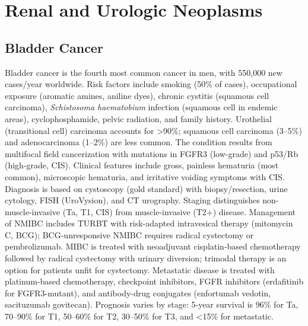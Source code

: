 \section{Renal and Urologic Neoplasms}








\label{sec:Renal and Urologic Neoplasms}

\subsection{Bladder Cancer}
\label{sec:Bladder Cancer}
Bladder cancer is the fourth most common cancer in men, with 550,000 new cases/year worldwide. Risk factors include smoking (50\% of cases), occupational exposure (aromatic amines, aniline dyes), chronic cystitis (squamous cell carcinoma), \textit{Schistosoma haematobium} infection (squamous cell in endemic areas), cyclophosphamide, pelvic radiation, and family history. Urothelial (transitional cell) carcinoma accounts for >90\%; squamous cell carcinoma (3--5\%) and adenocarcinoma (1--2\%) are less common. The condition results from multifocal field cancerization with mutations in FGFR3 (low-grade) and p53/Rb (high-grade, CIS). Clinical features include gross, painless hematuria (most common), microscopic hematuria, and irritative voiding symptoms with CIS. Diagnosis is based on cystoscopy (gold standard) with biopsy/resection, urine cytology, FISH (UroVysion), and CT urography. Staging distinguishes non-muscle-invasive (Ta, T1, CIS) from muscle-invasive (T2+) disease. Management of NMIBC includes TURBT with risk-adapted intravesical therapy (mitomycin C, BCG); BCG-unresponsive NMIBC requires radical cystectomy or pembrolizumab. MIBC is treated with neoadjuvant cisplatin-based chemotherapy followed by radical cystectomy with urinary diversion; trimodal therapy is an option for patients unfit for cystectomy. Metastatic disease is treated with platinum-based chemotherapy, checkpoint inhibitors, FGFR inhibitors (erdafitinib for FGFR3-mutant), and antibody-drug conjugates (enfortumab vedotin, sacituzumab govitecan). Prognosis varies by stage: 5-year survival is 96\% for Ta, 70--90\% for T1, 50--60\% for T2, 30--50\% for T3, and <15\% for metastatic.

